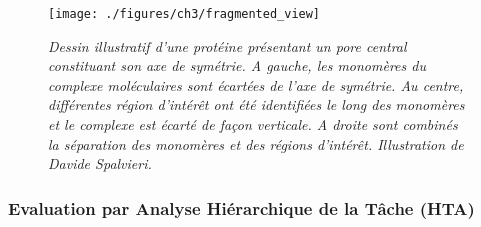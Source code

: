 \begin{figure}[h]
  \centering
  {\texttt{[image: ./figures/ch3/fragmented\_view]}}
    \caption{{\it Dessin illustratif d'une protéine présentant un pore central constituant son axe de symétrie. A gauche, les monomères du complexe moléculaires sont écartées de l'axe de symétrie. Au centre, différentes région d'intérêt ont été identifiées le long des monomères et le complexe est écarté de façon verticale. A droite sont combinés la séparation des monomères et des régions d'intérêt. Illustration de Davide Spalvieri.}}
  \label{Fig:fragmented_view}
  \hspace{0.2cm}
\end{figure}


\subsubsection{Evaluation par Analyse Hiérarchique de la Tâche (HTA)}

